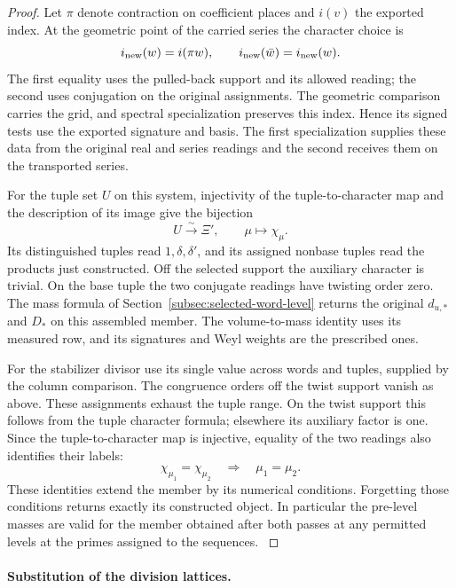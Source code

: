\begin{proof}
Let \(\pi\) denote contraction on coefficient places and \(i(v)\)
the exported index. At the geometric point of the carried series
the character choice is
\[
                 i_{\rm new}(w)=i(\pi w),\qquad
                 i_{\rm new}(\bar w)=i_{\rm new}(w).
\]
The first equality uses the pulled-back support and its allowed
reading; the second uses conjugation on the original assignments.
The geometric comparison carries the grid, and spectral
specialization preserves this index. Hence its signed tests use
the exported signature and basis. The first specialization supplies
these data from the original real and series readings and the
second receives them on the transported series.
\label{cor:automorphic-realization-61}

For the tuple set \(U\) on this system, injectivity of the tuple-to-character map and the description of its image give the bijection
\[
 U\xrightarrow{\ \sim\ }\Xi',\qquad \mu\longmapsto\chi_\mu .
\] Its distinguished tuples read
\(1,\delta,\delta'\), and its assigned nonbase tuples read the
products just constructed. Off the selected support the
auxiliary character is trivial. On the base tuple the two
conjugate readings have twisting order zero. The mass
formula of Section~\ref{subsec:selected-word-level} returns
the original \(d_{u,*}\) and \(D_*\) on this assembled member.
The volume-to-mass identity uses its measured row, and its
signatures and Weyl weights are the prescribed ones.

For the
stabilizer divisor use its single value across words and
tuples, supplied by the column comparison. The congruence
orders off the twist support vanish as above. These assignments exhaust the tuple range. On the twist support this follows from the tuple character formula; elsewhere its auxiliary factor is one. Since the tuple-to-character map is injective, equality of the two readings also identifies their labels:
\[
 \chi_{\mu_1}=\chi_{\mu_2}\quad\Longrightarrow\quad \mu_1=\mu_2 .
\] These identities extend the member
by its numerical conditions. Forgetting those conditions
returns exactly its constructed object. In particular the
pre-level masses are valid for the member obtained after both
passes at any permitted levels at the primes assigned to the sequences.
\label{cor:automorphic-realization-62}
\end{proof}

\paragraph{Substitution of the division lattices.}

